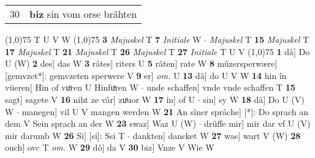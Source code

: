\documentclass[8pt,a4paper,notitlepage]{article}
\begin{document}
\begin{table}[ht]
\begin{minipage}[t]{0.5\linewidth}
\begin{tabular}{rl}
30 & \textbf{biz} sin vom orse brâhten\\ 
\end{tabular}
\scriptsize
\line(1,0){75} \newline
T U V W \newline
\line(1,0){75} \newline
\textbf{3} \textit{Majuskel} T  \textbf{7} \textit{Initiale} W   $\cdot$ \textit{Majuskel} T  \textbf{15} \textit{Majuskel} T  \textbf{17} \textit{Majuskel} T  \textbf{21} \textit{Majuskel} T  \textbf{26} \textit{Majuskel} T  \textbf{27} \textit{Initiale} T U V  \newline
\line(1,0){75} \newline
\textbf{1} dâ] Do U (W) \textbf{2} des] das W \textbf{3} râtes] riters U \textbf{5} râten] rate W \textbf{8} mûzersperwære] [gemvzet*]: gemvzeten sperwere V \textbf{9} er] \textit{om.} U \textbf{13} dâ] do U V W \textbf{14} hin în vüeren] Hin of vuͦren U Hinfuͤren W  $\cdot$ unde schaffen] vnde vnde schaffen T \textbf{15} sagt] sagete V \textbf{16} niht ze vâr] zuͦuor W \textbf{17} în] of U  $\cdot$ sin] sy W \textbf{18} dâ] Do U (V) W  $\cdot$ manegen] vil U V mangen werden W \textbf{21} An sîner sprâche] [*]: Do sprach an dem V Sein sprach an der W \textbf{23} swaz] Waz U (W)  $\cdot$ drûffe mir] mir dar vf U (V) mir darumb W \textbf{26} Si] [si]: Ssi T  $\cdot$ dankten] dancket W \textbf{27} was] wart V (W) \textbf{28} ouch] ovc T \textit{om.} W \textbf{29} dô] da V \textbf{30} biz] Vnze V Wie W \newline
\end{minipage}
\end{table}
\end{document}
